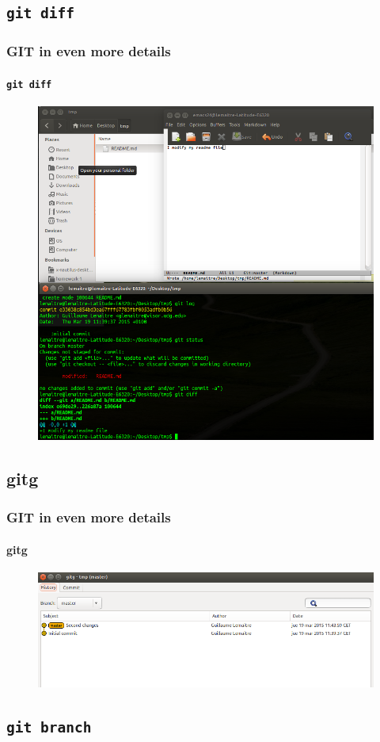 \documentclass{beamer}
\begin{document}
\subsection{\texttt{git diff}}

\begin{frame}
  \frametitle{GIT in even more details}
  \framesubtitle{\texttt{git diff}}
  \begin{figure}
      \centering
      \includegraphics[width=.65\textwidth]{./images/workflow/diff.png}
    \end{figure}
\end{frame}

\subsection{gitg}

\begin{frame}
  \frametitle{GIT in even more details}
  \framesubtitle{gitg}
  \begin{figure}
      \centering
      \includegraphics[width=.65\textwidth]{./images/workflow/gitg-1.png}
    \end{figure}
\end{frame}

\subsection{\texttt{git branch}}
\end{document}

